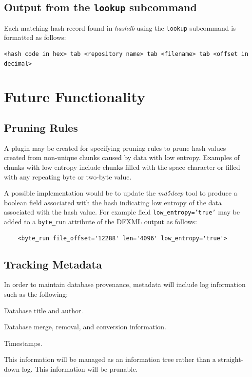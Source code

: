 \documentclass[12pt,twoside]{article}
\newcommand{\hdb}{\emph{hashdb}\xspace}
\newcommand{\mdd}{\emph{md5deep}\xspace}
\begin{document}
\subsection{Output from the \texttt{lookup} subcommand}
Each matching hash record found in \hdb using the \texttt{lookup} subcommand
is formatted as follows:
\begin{small}
\begin{verbatim}
<hash code in hex> tab <repository name> tab <filename> tab <offset in decimal>
\end{verbatim}
\end{small}

\section{Future Functionality}
\subsection{Pruning Rules}
A plugin may be created for specifying pruning rules to prune
hash values created from non-unique chunks caused by data with low entropy.
Examples of chunks with low entropy include
chunks filled with the space character
or filled with any repeating byte or two-byte value.

A possible implementation would be to update the \mdd tool
to produce a boolean field associated with the hash
indicating low entropy of the data associated with the hash value.
For example field \texttt{low\_entropy='true'} may be added
to a \texttt{byte\_run} attribute of the DFXML output as follows:
\begin{small}
\begin{verbatim}
    <byte_run file_offset='12288' len='4096' low_entropy='true'> 
\end{verbatim}
\end{small}

\subsection{Tracking Metadata}
In order to maintain database provenance,
metadata will include log information such as the following:
\begin{compactitem}
\item Database title and author.
\item Database merge, removal, and conversion information.
\item Timestamps.
\end{compactitem}
This information will be managed as an information tree
rather than a straight-down log.
This information will be prunable.
\end{document}
